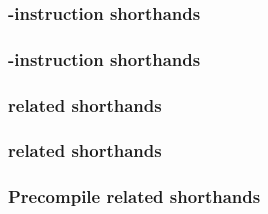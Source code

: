 \subsubsection{-instruction shorthands \lispDone{}}          \label{hub: scenarios: shorthands: call}           
\subsubsection{-instruction shorthands \lispWip {}}        \label{hub: scenarios: shorthands: create}         
\subsubsection{ related shorthands \lispDone{}}            \label{hub: scenarios: shorthands: return}         
\subsubsection{ related shorthands \lispDone{}}      \label{hub: scenarios: shorthands: selfdestruct}   
\subsubsection{Precompile related shorthands \lispDone{}}               \label{hub: scenarios: shorthands: precompile}     
